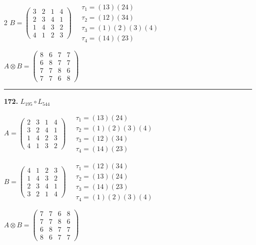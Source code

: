 \begin{multicols}{2}
$B = \begin{pmatrix} 3 & 2 & 1 & 4 \\ 2 & 3 & 4 & 1 \\ 1 & 4 & 3 & 2 \\ 4 & 1 & 2 & 3 \end{pmatrix} \quad \begin{matrix} \tau_{1}=(1 3)(2 4) \\ \tau_{2}=(1 2)(3 4) \\ \tau_{3}=(1)(2)(3)(4) \\ \tau_{4}=(1 4)(2 3) \end{matrix}$

$A \otimes B = \begin{pmatrix} 8 & 6 & 7 & 7 \\ 6 & 8 & 7 & 7 \\ 7 & 7 & 8 & 6 \\ 7 & 7 & 6 & 8 \end{pmatrix}$

\vspace{0.3em}
\hrule
\vspace{0.3em}

\noindent\textbf{172.} $L_{195} \circ L_{544}$

$A = \begin{pmatrix} 2 & 3 & 1 & 4 \\ 3 & 2 & 4 & 1 \\ 1 & 4 & 2 & 3 \\ 4 & 1 & 3 & 2 \end{pmatrix} \quad \begin{matrix} \tau_{1}=(1 3)(2 4) \\ \tau_{2}=(1)(2)(3)(4) \\ \tau_{3}=(1 2)(3 4) \\ \tau_{4}=(1 4)(2 3) \end{matrix}$

$B = \begin{pmatrix} 4 & 1 & 2 & 3 \\ 1 & 4 & 3 & 2 \\ 2 & 3 & 4 & 1 \\ 3 & 2 & 1 & 4 \end{pmatrix} \quad \begin{matrix} \tau_{1}=(1 2)(3 4) \\ \tau_{2}=(1 3)(2 4) \\ \tau_{3}=(1 4)(2 3) \\ \tau_{4}=(1)(2)(3)(4) \end{matrix}$

$A \otimes B = \begin{pmatrix} 7 & 7 & 6 & 8 \\ 7 & 7 & 8 & 6 \\ 6 & 8 & 7 & 7 \\ 8 & 6 & 7 & 7 \end{pmatrix}$


\end{multicols}

